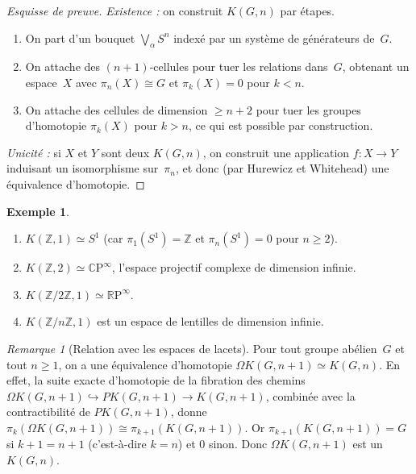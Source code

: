 \documentclass[12pt,a4paper,openany]{book}
\theoremstyle{definition}
\newtheorem{exemple}[definition]{Exemple}
\theoremstyle{plain}
\theoremstyle{remark}
\newtheorem{remarque}[definition]{Remarque}
\newcommand{\Z}{\mathbb{Z}}
\newcommand{\RP}{\mathbb{R}\mathrm{P}}
\newcommand{\CP}{\mathbb{C}\mathrm{P}}
\begin{document}
\begin{proof}[Esquisse de preuve]
  \emph{Existence :} on construit $K(G, n)$ par étapes.
  \begin{enumerate}[label=\arabic*.]
    \item On part d'un bouquet $\bigvee_\alpha S^n$ indexé par un système de
          générateurs de~$G$.
    \item On attache des $(n{+}1)$-cellules pour tuer les relations dans~$G$,
          obtenant un espace~$X$ avec $\pi_n(X) \cong G$ et $\pi_k(X) = 0$
          pour $k < n$.
    \item On attache des cellules de dimension $\geq n+2$ pour tuer les groupes
          d'homotopie $\pi_k(X)$ pour $k > n$, ce qui est possible par construction.
  \end{enumerate}
  \emph{Unicité :} si $X$ et $Y$ sont deux $K(G, n)$, on construit une application
  $f \colon X \to Y$ induisant un isomorphisme sur~$\pi_n$, et donc (par Hurewicz
  et Whitehead) une équivalence d'homotopie.
\end{proof}

\begin{exemple}\label{ex:em-espaces}
  \begin{enumerate}[label=(\roman*)]
    \item $K(\Z, 1) \simeq S^1$\index{$K(\Z,1)$} (car $\pi_1(S^1) = \Z$ et
          $\pi_n(S^1) = 0$ pour $n \geq 2$).
    \item $K(\Z, 2) \simeq \CP^\infty$\index{$K(\Z,2)$}, l'espace projectif complexe
          de dimension infinie.
    \item $K(\Z/2\Z, 1) \simeq \RP^\infty$\index{$K(\Z/2\Z,1)$}.
    \item $K(\Z/n\Z, 1)$ est un espace de lentilles de
          dimension infinie.
  \end{enumerate}
\end{exemple}

\begin{remarque}[Relation avec les espaces de lacets]\label{rem:em-lacets}
  Pour tout groupe abélien~$G$ et tout $n \geq 1$, on a une équivalence d'homotopie
  $\Omega K(G, n+1) \simeq K(G, n)$. En effet, la suite exacte d'homotopie de la
  fibration des chemins $\Omega K(G, n+1) \hookrightarrow PK(G, n+1) \to K(G, n+1)$,
  combinée avec la contractibilité de $PK(G, n+1)$, donne
  $\pi_k(\Omega K(G, n+1)) \cong \pi_{k+1}(K(G, n+1))$. Or
  $\pi_{k+1}(K(G, n+1)) = G$ si $k+1 = n+1$ (c'est-à-dire $k = n$) et $0$ sinon.
  Donc $\Omega K(G, n+1)$ est un $K(G, n)$.
\end{remarque}
\end{document}
